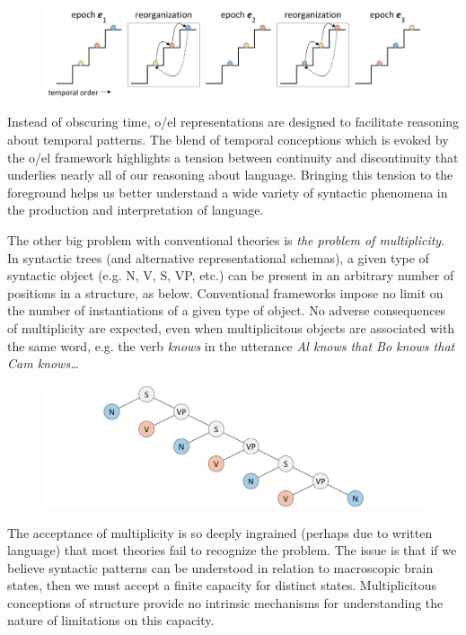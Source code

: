   
\begin{figure}
\includegraphics[width=\textwidth]{figures/Tilsen-img6.png}
\caption{\missingcaption}
\label{fig:1:6}
\end{figure}
 

  Instead of obscuring time, o/el representations are designed to facilitate reasoning about temporal patterns. The blend of temporal conceptions which is evoked by the o/el framework highlights a tension between continuity and discontinuity that underlies nearly all of our reasoning about language. Bringing this tension to the foreground helps us better understand a wide variety of syntactic phenomena in the production and interpretation of language.

The other big problem with conventional theories is \textit{the problem of multiplicity}. In syntactic trees (and alternative representational schemas), a given type of syntactic object (e.g. N, V, S, VP, etc.) can be present in an arbitrary number of positions in a structure, as below. Conventional frameworks impose no limit on the number of instantiations of a given type of object. No adverse consequences of multiplicity are expected, even when multiplicitous objects are associated with the same word, e.g. the verb \textit{knows} in the utterance \textit{Al knows that Bo knows that Cam knows…}  

  
\begin{figure}
\includegraphics[width=\textwidth]{figures/Tilsen-img7.png}
\caption{\missingcaption}
\label{fig:1:7}
\end{figure}
 

  The acceptance of multiplicity is so deeply ingrained (perhaps due to written language) that most theories fail to recognize the problem. The issue is that if we believe syntactic patterns can be understood in relation to macroscopic brain states, then we must accept a finite capacity for distinct states. Multiplicitous conceptions of structure provide no intrinsic mechanisms for understanding the nature of limitations on this capacity.

